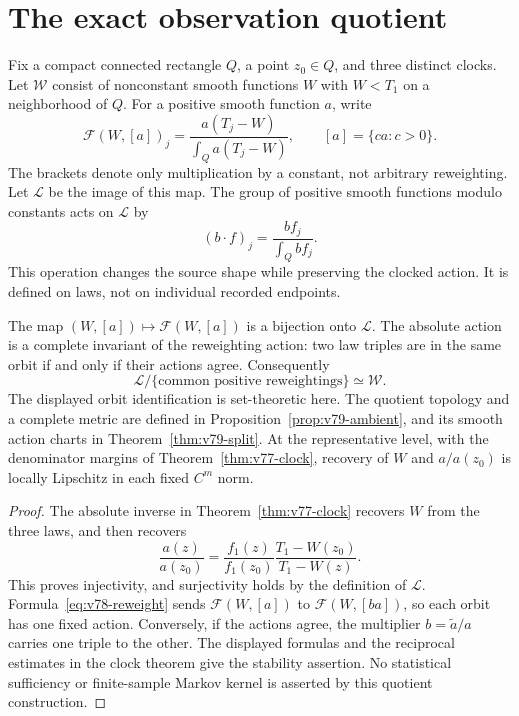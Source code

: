 \section{The exact observation quotient}
\label{sec:v78-information}

Fix a compact connected rectangle $Q$, a point $z_0\in Q$, and three
distinct clocks.  Let $\mathscr W$ consist of nonconstant smooth
functions $W$ with $W<T_1$ on a neighborhood of $Q$.  For a positive
smooth function $a$, write
\[
 \mathcal F(W,[a])_j=
 \frac{a(T_j-W)}{\int_Q a(T_j-W)},\qquad [a]=\{ca:c>0\}.
\]
The brackets denote only multiplication by a constant, not arbitrary
reweighting.  Let $\mathscr L$ be the image of this map.  The group of
positive smooth functions modulo constants acts on $\mathscr L$ by
\begin{equation}\label{eq:v78-reweight}
 (b\cdot f)_j=\frac{b f_j}{\int_Q b f_j}.
\end{equation}
This operation changes the source shape while preserving the clocked
action.  It is defined on laws, not on individual recorded endpoints.

\begin{theorem}
\label{thm:v78-quotient}
The map $(W,[a])\mapsto\mathcal F(W,[a])$ is a bijection onto
$\mathscr L$.  The absolute action is a complete invariant of the
reweighting action: two law triples are in the same orbit if and only
if their actions agree.  Consequently
\[
                 \mathscr L/\{\text{common positive reweightings}\}
                         \simeq \mathscr W.
\]
The displayed orbit identification is set-theoretic here.  The quotient
topology and a complete metric are defined in
Proposition~\ref{prop:v79-ambient}, and its smooth action charts in
Theorem~\ref{thm:v79-split}.  At the representative level, with the
denominator margins of Theorem~\ref{thm:v77-clock}, recovery of $W$
and $a/a(z_0)$ is locally Lipschitz in each fixed $C^m$ norm.
\end{theorem}
\begin{proof}
The absolute inverse in Theorem~\ref{thm:v77-clock} recovers $W$
from the three laws, and then recovers
\[
 \frac{a(z)}{a(z_0)}=
 \frac{f_1(z)}{f_1(z_0)}\frac{T_1-W(z_0)}{T_1-W(z)}.
\]
This proves injectivity, and surjectivity holds by the definition of
$\mathscr L$.  Formula~\eqref{eq:v78-reweight} sends
$\mathcal F(W,[a])$ to $\mathcal F(W,[ba])$, so each orbit has one
fixed action.  Conversely, if the actions agree, the multiplier
$b=\widetilde a/a$ carries one triple to the other.  The displayed
formulas and the reciprocal estimates in the clock theorem give the
stability assertion.  No statistical sufficiency or finite-sample
Markov kernel is asserted by this quotient construction.
\end{proof}

